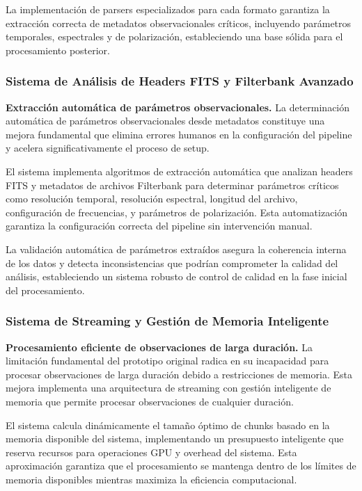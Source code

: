 La implementación de parsers especializados para cada formato garantiza la extracción correcta de metadatos observacionales críticos, incluyendo parámetros temporales, espectrales y de polarización, estableciendo una base sólida para el procesamiento posterior.

\subsubsection{Sistema de Análisis de Headers FITS y Filterbank Avanzado}

\noindent\textbf{Extracción automática de parámetros observacionales.} La determinación automática de parámetros observacionales desde metadatos constituye una mejora fundamental que elimina errores humanos en la configuración del pipeline y acelera significativamente el proceso de setup.

El sistema implementa algoritmos de extracción automática que analizan headers FITS y metadatos de archivos Filterbank para determinar parámetros críticos como resolución temporal, resolución espectral, longitud del archivo, configuración de frecuencias, y parámetros de polarización. Esta automatización garantiza la configuración correcta del pipeline sin intervención manual.

La validación automática de parámetros extraídos asegura la coherencia interna de los datos y detecta inconsistencias que podrían comprometer la calidad del análisis, estableciendo un sistema robusto de control de calidad en la fase inicial del procesamiento.

\subsubsection{Sistema de Streaming y Gestión de Memoria Inteligente}

\noindent\textbf{Procesamiento eficiente de observaciones de larga duración.} La limitación fundamental del prototipo original radica en su incapacidad para procesar observaciones de larga duración debido a restricciones de memoria. Esta mejora implementa una arquitectura de streaming con gestión inteligente de memoria que permite procesar observaciones de cualquier duración.

El sistema calcula dinámicamente el tamaño óptimo de chunks basado en la memoria disponible del sistema, implementando un presupuesto inteligente que reserva recursos para operaciones GPU y overhead del sistema. Esta aproximación garantiza que el procesamiento se mantenga dentro de los límites de memoria disponibles mientras maximiza la eficiencia computacional.


